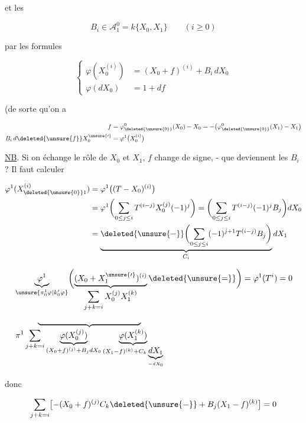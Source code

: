 
et les

\[
\boxed{B_i\in\mathcal A_1^0=k\{X_0,X_1\}\qquad (i\geq0)}
\]

par les formules

\[
\left\{\begin{aligned}
\varphi(X_0^{(i)})&=(X_0+f)^{(i)}+B_i\,dX_0\\
\varphi(dX_0)&=1+df
\end{aligned}\right.
\]

(de sorte qu'on a

\[
\begin{aligned}
 f&=\varphi_{\deleted{\unsure{0}}}^{0}(X_0)-X_0=-\bigl(\varphi_{\deleted{\unsure{0}}}^{0}(X_1)-X_1\bigr)\\
 B_i\,d\deleted{\unsure{f}}X_0^{\unsure{\prime}}&=\varphi^1\bigl(X_0^{(i)}\bigr)
\end{aligned}
\]

\uline{NB}. Si on échange le rôle de $X_0$ et $X_1$, $f$ change de signe, - que deviennent les $B_i$ ? Il faut calculer

\[
\begin{aligned}
\varphi^1(X_{\deleted{\unsure{0}}1}^{(i)})&=\varphi^1\bigl((T-X_0)^{(i)}\bigr)\\
&=\varphi^1\biggl(\sum_{0\leq j\leq i}T^{(i-j)}X_0^{(j)}(-1)^j\biggr)
=\biggl(\sum_{0\leq j\leq i} T^{(i-j)}(-1)^j B_j\biggr)dX_0\\
&=\underbrace{\deleted{\unsure{-}}\biggl(\sum_{0\leq j\leq i}(-1)^{j+1} T^{(i-j)} B_j\biggr)}_{C_i}dX_1
\end{aligned}
\]

 

\[
\begin{aligned}
&\underbrace{\varphi^1}_{\unsure{\pi_0^1\varphi|k'_0\varphi}}
\biggl(\underbrace{(X_0+X_1^{\unsure{\prime}})^{(i)}}_{\displaystyle\sum_{j+k=i}X_0^{(j)}X_1^{(k)}}\deleted{\unsure{=}}\biggr)
=\varphi^1(T^i)=0\\
&\underbrace{\hspace{4.4cm}}_{\displaystyle\pi^1\sum_{j+k=i}
\underbrace{\varphi(X_0^{(j)})}_{(X_0+f)^{(j)}+B_jdX_0}
\underbrace{\varphi(X_1^{(k)})}_{(X_1-f)^{(k)}+C_k\underbrace{dX_1}_{-dX_0}}}
\end{aligned}
\]

donc

\[
\sum_{j+k=i}\bigl[-(X_0+f)^{(j)}C_k\deleted{\unsure{-}}+B_j(X_1-f)^{(k)}\bigr]=0
\]

